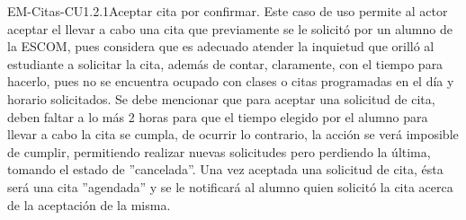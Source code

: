 \begin{UseCase}{EM-Citas-CU1.2.1}{Aceptar cita por confirmar.}
	{
	\noindent
	Este caso de uso permite al actor aceptar el llevar a cabo una cita que previamente se le solicitó por un alumno de la ESCOM, pues considera que es adecuado atender la inquietud que orilló al estudiante a solicitar la cita, además de contar, claramente, con el tiempo para hacerlo, pues no se encuentra ocupado con clases o citas programadas en el día y horario solicitados. Se debe mencionar que para aceptar una solicitud de cita, deben faltar a lo más 2 horas para que el tiempo elegido por el alumno para llevar a cabo la cita se cumpla, de ocurrir lo contrario, la acción se verá imposible de cumplir, permitiendo realizar nuevas solicitudes pero perdiendo la última, tomando el estado de ''cancelada''. Una vez aceptada una solicitud de cita, ésta será una cita ''agendada'' y se le notificará al alumno quien solicitó la cita acerca de la aceptación de la misma.
	\newline
	}
\end{UseCase}

